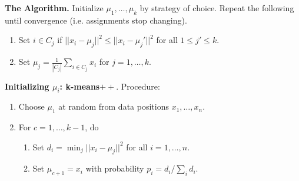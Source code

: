 \documentclass[12pt]{article}
\newcommand\p{\Needspace{10\baselineskip} \noindent}
\begin{document}
\p \textbf{The Algorithm.} Initialize $\mu_1, \ldots, \mu_k$ by strategy of choice. Repeat the following until convergence (i.e. assignments stop changing).
\begin{enumerate}
	\item Set $i \in C_j$ if $|| x_i - \mu_j ||^2 \le ||x_i - \mu_j'||^2$ for all $1 \le j' \le k$. 
	
	\item Set $\mu_j = \frac{1}{|C_j|} \sum_{i \in C_j} x_i$ for $j = 1, \ldots, k$. \\
\end{enumerate}

\p \textbf{Initializing $\mu_i$: k-means$++$}. Procedure:
\begin{enumerate}
	\item Choose $\mu_1$ at random from data positions $x_1, \ldots, x_n$.
	\item For $c = 1, \ldots, k - 1$, do
	\begin{enumerate}
		\item Set $d_i = \min_j ||x_i - \mu_j||^2$ for all $i = 1, \ldots, n$. 
		\item Set $\mu_{c + 1} = x_i$ with probability $p_i = d_i / \sum_i d_i$. 
	\end{enumerate}
\end{enumerate}
\end{document}
